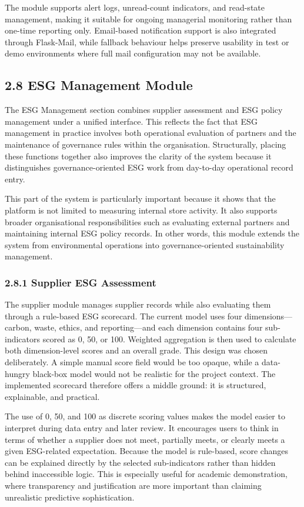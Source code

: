 \documentclass[10pt,a4paper]{article}
\begin{document}
The module supports alert logs, unread-count indicators, and read-state management, making it suitable for ongoing managerial monitoring rather than one-time reporting only. Email-based notification support is also integrated through Flask-Mail, while fallback behaviour helps preserve usability in test or demo environments where full mail configuration may not be available.

\subsection*{2.8 ESG Management Module}
The ESG Management section combines supplier assessment and ESG policy management under a unified interface. This reflects the fact that ESG management in practice involves both operational evaluation of partners and the maintenance of governance rules within the organisation. Structurally, placing these functions together also improves the clarity of the system because it distinguishes governance-oriented ESG work from day-to-day operational record entry.

This part of the system is particularly important because it shows that the platform is not limited to measuring internal store activity. It also supports broader organisational responsibilities such as evaluating external partners and maintaining internal ESG policy records. In other words, this module extends the system from environmental operations into governance-oriented sustainability management.

\subsubsection*{2.8.1 Supplier ESG Assessment}
The supplier module manages supplier records while also evaluating them through a rule-based ESG scorecard. The current model uses four dimensions---carbon, waste, ethics, and reporting---and each dimension contains four sub-indicators scored as 0, 50, or 100. Weighted aggregation is then used to calculate both dimension-level scores and an overall grade. This design was chosen deliberately. A simple manual score field would be too opaque, while a data-hungry black-box model would not be realistic for the project context. The implemented scorecard therefore offers a middle ground: it is structured, explainable, and practical.

The use of 0, 50, and 100 as discrete scoring values makes the model easier to interpret during data entry and later review. It encourages users to think in terms of whether a supplier does not meet, partially meets, or clearly meets a given ESG-related expectation. Because the model is rule-based, score changes can be explained directly by the selected sub-indicators rather than hidden behind inaccessible logic. This is especially useful for academic demonstration, where transparency and justification are more important than claiming unrealistic predictive sophistication.
\end{document}
